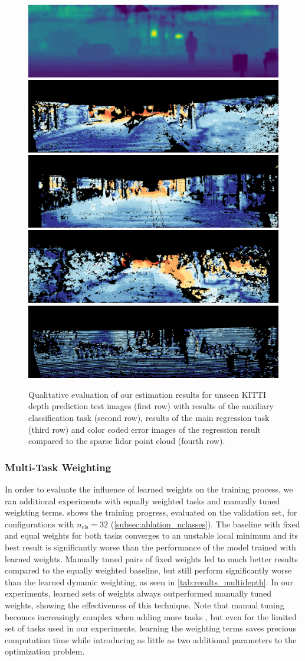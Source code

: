 \documentclass[lang=english]{tumarxivarticle}
\newcommand{\citep}{\parencite}
\begin{document}
\begin{figure}
  \includegraphics[width=.24\linewidth]{figures/result_images/14_reg} \\[1mm]
  \includegraphics[width=.24\linewidth]{figures/result_images/7_err} \hfill
  \includegraphics[width=.24\linewidth]{figures/result_images/10_err} \hfill
  \includegraphics[width=.24\linewidth]{figures/result_images/9_err} \hfill
  \includegraphics[width=.24\linewidth]{figures/result_images/14_err}
  \caption{Qualitative evaluation of our estimation results for unseen KITTI depth prediction test images \citep{Uhrig17, Geiger13} (first row) with results of the auxiliary classification task (second row), results of the main regression task (third row) and color coded error images of the regression result compared to the sparse \gls{lidar} point cloud (fourth row).}
  \label{fig:result_images}
\end{figure}


\subsubsection{Multi-Task Weighting}
\label{subsec:ablation_mt}

In order to evaluate the influence of learned weights \citep{Kendall18} on the training process, we ran additional experiments with equally weighted tasks and manually tuned weighting terms.
 shows the training progress, evaluated on the validation set, for configurations with $n_\text{cls} = 32$ (\cf \cref{subsec:ablation_nclasses}).
The baseline with fixed and equal weights for both tasks converges to an unstable local minimum and its best result is significantly worse than the performance of the model trained with learned weights.
Manually tuned pairs of fixed weights led to much better results compared to the equally weighted baseline, but still perform significantly worse than the learned dynamic weighting, as seen in \cref{tab:results_multidepth}.
In our experiments, learned sets of weights always outperformed manually tuned weights, showing the effectiveness of this technique.
Note that manual tuning becomes increasingly complex when adding more tasks \citep{Kendall18,Liebel18}, but even for the limited set of tasks used in our experiments, learning the weighting terms saves precious computation time while introducing as little as two additional parameters to the optimization problem.
\end{document}
